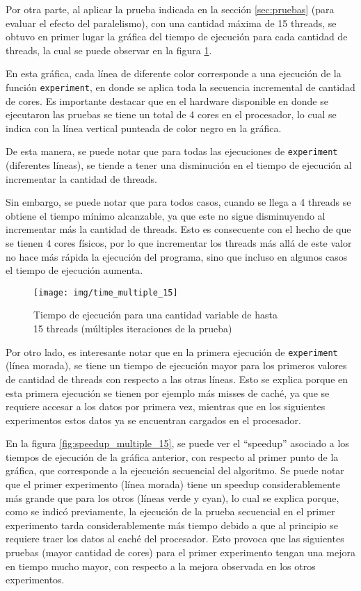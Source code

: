 \documentclass {article}
\begin{document}
Por otra parte, al aplicar la prueba indicada en la sección \ref{sec:pruebas} (para evaluar el
efecto del paralelismo), con una cantidad máxima de 15 threads, se obtuvo en primer lugar la gráfica
del tiempo de ejecución para cada cantidad de threads, la cual se puede observar en la figura
\ref{fig:time_multiple_15}.

En esta gráfica, cada línea de diferente color corresponde a una ejecución de la función
\texttt{experiment}, en donde se aplica toda la secuencia incremental de cantidad de cores. Es
importante destacar que en el hardware disponible en donde se ejecutaron las pruebas se tiene un
total de 4 cores en el procesador, lo cual se indica con la línea vertical punteada de color negro
en la gráfica. 

De esta manera, se puede notar que para todas las ejecuciones de \texttt{experiment} (diferentes
líneas), se tiende a tener una disminución en el tiempo de ejecución al incrementar la cantidad de
threads. 

Sin embargo, se puede notar que para todos casos, cuando se llega a 4 threads se obtiene el tiempo
mínimo alcanzable, ya que este no sigue disminuyendo al incrementar más la cantidad de threads. Esto
es consecuente con el hecho de que se tienen 4 cores físicos, por lo que incrementar los threads más
allá de este valor no hace más rápida la ejecución del programa, sino que incluso en algunos casos
el tiempo de ejecución aumenta.

\begin{figure}[H]
  \centering
  \texttt{[image: img/time\_multiple\_15]}
  \caption{\label{fig:time_multiple_15}Tiempo de ejecución para una cantidad variable de hasta \\15 threads (múltiples
    iteraciones de la prueba)}
\end{figure}

Por otro lado, es interesante notar que en la primera ejecución de \texttt{experiment} (línea
morada), se tiene un tiempo de ejecución mayor para los primeros valores de cantidad de threads con
respecto a las otras líneas. Esto se explica porque en esta primera ejecución se tienen por ejemplo
más misses de caché, ya que se requiere accesar a los datos por primera vez, mientras que en los
siguientes experimentos estos datos ya se encuentran cargados en el procesador.

En la figura \ref{fig:speedup_multiple_15}, se puede ver el ``speedup'' asociado a los tiempos de
ejecución de la gráfica anterior, con respecto al primer punto de la gráfica, que corresponde a la
ejecución secuencial del algoritmo. Se puede notar que el primer experimento (línea morada) tiene un
speedup considerablemente más grande que para los otros (líneas verde y cyan), lo cual se explica
porque, como se indicó previamente, la ejecución de la prueba secuencial en el primer experimento
tarda considerablemente más tiempo debido a que al principio se requiere traer los datos al caché
del procesador. Esto provoca que las siguientes pruebas (mayor cantidad de cores) para el primer
experimento tengan una mejora en tiempo mucho mayor, con respecto a la mejora observada en los otros
experimentos.
\end{document}
